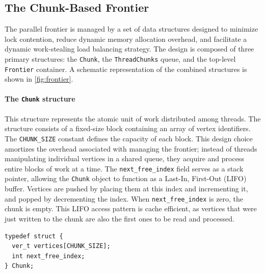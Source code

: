 \subsection{The Chunk-Based Frontier}

The parallel frontier is managed by a set of data structures designed to minimize lock contention, reduce dynamic memory allocation overhead, and facilitate a dynamic work-stealing load balancing strategy. The design is composed of three primary structures: the \texttt{Chunk}, the \texttt{ThreadChunks} queue, and the top-level \texttt{Frontier} container. A schematic representation of the combined structures is shown in \cref{fig:frontier}.

\paragraph{The \texttt{Chunk} structure} This structure represents the atomic unit of work distributed among threads. The structure consists of a fixed-size block containing an array of vertex identifiers. The \texttt{CHUNK\_SIZE} constant defines the capacity of each block. This design choice amortizes the overhead associated with managing the frontier; instead of threads manipulating individual vertices in a shared queue, they acquire and process entire blocks of work at a time. The \texttt{next\_free\_index} field serves as a stack pointer, allowing the \texttt{Chunk} object to function as a Last-In, First-Out (LIFO) buffer. Vertices are pushed by placing them at this index and incrementing it, and popped by decrementing the index. When \texttt{next\_free\_index} is zero, the chunk is empty. This LIFO access pattern is cache efficient, as vertices that were just written to the chunk are also the first ones to be read and processed.

\begin{verbatim}
typedef struct {
  ver_t vertices[CHUNK_SIZE];
  int next_free_index;
} Chunk;
\end{verbatim}

